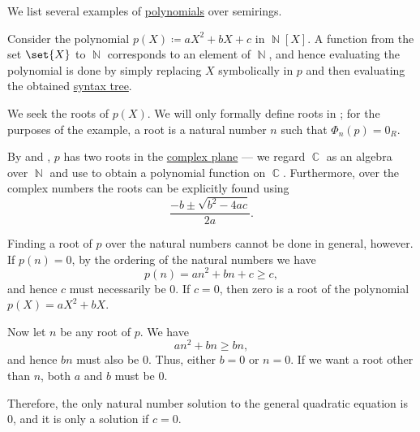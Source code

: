 \begin{example}\label{ex:def:polynomial_algebra}
  We list several examples of \hyperref[def:polynomial_algebra]{polynomials} over semirings.
  \begin{thmenum}
     Consider the polynomial \( p(X) \coloneqq aX^2 + bX + c \) in \( \BbbN[X] \). A function from the set \( \set{ X } \) to \( \BbbN \) corresponds to an element of \( \BbbN \), and hence evaluating the polynomial is done by simply replacing \( X \) symbolically in \( p \) and then evaluating the obtained \hyperref[rem:binary_operation_syntax_trees]{syntax tree}.

    We seek the roots of \( p(X) \). We will only formally define roots in ; for the purposes of the example, a root is a natural number \( n \) such that \( \Phi_n(p) = 0_R \).

    By  and , \( p \) has two roots in the \hyperref[def:complex_numbers]{complex plane} --- we regard \( \BbbC \) as an algebra over \( \BbbN \) and use  to obtain a polynomial function on \( \BbbC \). Furthermore, over the complex numbers the roots can be explicitly found using
    \begin{equation*}
      \frac {-b \pm \sqrt{b^2 - 4ac}} {2a}.
    \end{equation*}

    Finding a root of \( p \) over the natural numbers cannot be done in general, however. If \( p(n) = 0 \), by the ordering of the natural numbers we have
    \begin{equation*}
      p(n) = an^2 + bn + c \geq c,
    \end{equation*}
    and hence \( c \) must necessarily be \( 0 \). If \( c = 0 \), then zero is a root of the polynomial \( p(X) = aX^2 + bX \).

    Now let \( n \) be any root of \( p \). We have
    \begin{equation*}
      an^2 + bn \geq bn,
    \end{equation*}
    and hence \( bn \) must also be \( 0 \). Thus, either \( b = 0 \) or \( n = 0 \). If we want a root other than \( n \), both \( a \) and \( b \) must be \( 0 \).

    Therefore, the only natural number solution to the general quadratic equation is \( 0 \), and it is only a solution if \( c = 0 \).


\end{thmenum}
\end{example}

